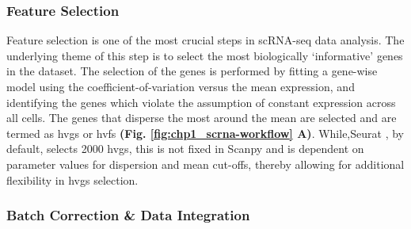 \subsubsection{Feature Selection}
Feature selection is one of the most crucial steps in scRNA-seq data analysis. The underlying theme of this step is to select the most biologically `informative' genes in the dataset. The selection of the genes is performed by fitting a gene-wise model using the coefficient-of-variation versus the mean expression, and identifying the genes which violate the assumption of constant expression across all cells. The genes that disperse the most around the mean are selected and are termed as \glspl{hvg} or \glspl{hvf} \textbf{(Fig. \ref{fig:chp1_scrna-workflow} A)}. %
While,Seurat \textbf{\cite{butler_integrating_2018,stuart_comprehensive_2019,hao_integrated_2021}}, by default, selects 2000 \glspl{hvg}, this is not fixed in Scanpy \textbf{\cite{wolf_scanpy_2018}} and is dependent on parameter values for dispersion and mean cut-offs, thereby allowing for additional flexibility in \glspl{hvg} selection.

\subsubsection{Batch Correction \& Data Integration}

